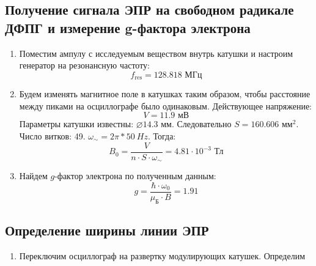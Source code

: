 \documentclass[a4paper, 12pt]{article}
\begin{document}
	\subsection{Получение сигнала ЭПР  на свободном радикале ДФПГ и измерение g-фактора электрона}
	\begin{enumerate}
		\item Поместим ампулу с исследуемым веществом внутрь катушки и настроим генератор на резонансную частоту:
		\begin{equation*}
			f_{\text{res}}=128.818\text{ МГц}
		\end{equation*}
		\item Будем изменять магнитное поле в катушках таким образом, чтобы расстояние между пиками на осциллографе было одинаковым. Действующее напряжение:
		\begin{equation*}
			V=11.9\text{ мВ}
		\end{equation*}
		Параметры катушки известны: $\diameter 14.3$ мм. Следовательно $S=160.606$ мм$^{2}$. Число витков: 49. $\omega_{\sim}=2\pi*50\ Hz$. Тогда:
		\begin{equation*}
			B_0=\frac{V}{n\cdot S\cdot\omega_{\sim}}=4.81\cdot 10^{-3}\text{ Тл}
		\end{equation*}
		\item Найдем $g$-фактор электрона по полученным данным:
		\begin{equation*}
			g=\frac{\hbar\cdot\omega_0}{\mu_{\text{Б}}\cdot B}=1.91
		\end{equation*}
	\end{enumerate}
	\subsection{Определение ширины линии ЭПР}
	\begin{enumerate}
		\item Переключим осциллограф на развертку модулирующих катушек. Определим 
	\end{enumerate}
\end{document}
